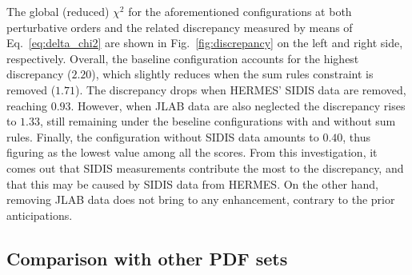 The global (reduced) $\chi^2$ for the aforementioned configurations at both perturbative orders and the related discrepancy measured by means of Eq.~\eqref{eq:delta_chi2} are shown in Fig.~\ref{fig:discrepancy} on the left and right side, respectively. Overall, the baseline configuration accounts for the highest discrepancy ($2.20$), which slightly reduces when the sum rules constraint is removed ($1.71$). The discrepancy drops when HERMES' SIDIS data are removed, reaching $0.93$. However, when JLAB data are also neglected the discrepancy rises to $1.33$, still remaining under the beseline configurations with and without sum rules. Finally, the configuration without SIDIS data amounts to $0.40$, thus figuring as the lowest value among all the scores. From this investigation, it comes out that SIDIS measurements contribute the most to the discrepancy, and that this may be caused by SIDIS data from HERMES. On the other hand, removing JLAB data does not bring to any enhancement, contrary to the prior anticipations.%

\subsection{Comparison with other PDF sets}

